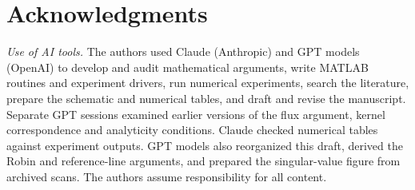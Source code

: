 \section*{Acknowledgments}
\emph{Use of AI tools.} The authors used Claude (Anthropic) and GPT models
(OpenAI) to develop and audit mathematical arguments, write MATLAB
routines and experiment drivers, run numerical experiments, search the
literature, prepare the schematic and numerical tables, and draft and
revise the manuscript. Separate GPT sessions examined earlier versions
of the flux argument, kernel correspondence and analyticity conditions.
Claude checked numerical tables against experiment outputs. GPT models
also reorganized this draft, derived the Robin and reference-line
arguments, and prepared the singular-value figure from archived scans.
The authors assume responsibility for all content.

